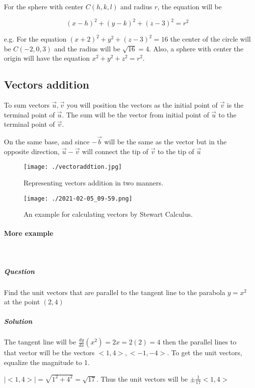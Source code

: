 \documentclass{article}
\begin{document}
For the sphere with center $C(h,k,l)$ and radius $r$, the equation will be

\begin{equation}
	(x-h)^2 + (y-k)^2 +(z-3)^2 = r^2
\end{equation}

e.g. For the equation $(x+2)^2 + y^2 + (z-3)^2 = 16$ the center of the circle will be $C(-2,0,3)$ and the radius will be $ \sqrt{16} = 4$. Also, a sphere with center the origin will have the equation $x^2+y^2+z^2=r^2$.

\subsection{Vectors addition}

To sum vectors $\vec{u}, \vec{v}$ you will position the vectors as the initial point of $\vec{v}$ is the terminal point of $\vec{u}$. The sum will be the vector from initial point of $\vec{u}$ to the terminal point of $\vec{v}$.

On the same base, and since $-\vec{b}$ will be the same as the vector but in the opposite direction, $\vec{u} - \vec{v}$ will connect the tip of $\vec{v}$ to the tip of $\vec{u}$

\begin{figure}[h!]
	\texttt{[image: ./vectoraddtion.jpg]}
	\caption{Representing vectors addition in two manners.}
\end{figure}

\begin{figure}[h!]
	\texttt{[image: ./2021-02-05\_09-59.png]}
	\caption{An example for calculating vectors by Stewart Calculus.}
\end{figure}	

\paragraph{More example} \

\subparagraph{Question}
Find the unit vectors that are parallel to the tangent line to the parabola $y=x^2$ at the point $(2,4)$

\subparagraph{Solution}
The tangent line will be $ \frac{dy}{dx}(x^2) = 2x = 2(2) = 4$ then the parallel lines to that vector will be the vectors $<1,4>,<-1,-4>$. To get the unit vectors, equalize the magnitude to 1. 

$|<1,4>| = \sqrt{1^2 + 4^2} = \sqrt{17}$. Thus the unit vectors will be $\pm\frac{1}{17}<1,4>$
\end{document}
